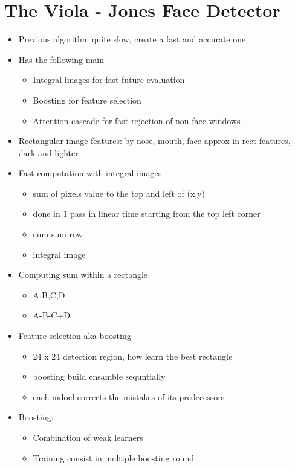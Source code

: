 \documentclass[12pt,oneside]{report}
\begin{document}
\section{The Viola - Jones Face Detector}
\begin{itemize}
    \item Previous algorithm quite slow, create a fast and accurate one
    \item Has the following main 
    \begin{itemize}
        \item Integral images for fast future evaluation
        \item Boosting for feature selection
        \item Attention cascade for fast rejection of non-face windows
    \end{itemize}
    \item Rectangular image features: by nose, mouth, face approx in rect features, dark and lighter
    \item Fast computation with integral images
    \begin{itemize}
        \item sum of pixels value to the top and left of (x,y)
        \item done in 1 pass in linear time starting from the top left corner
        \item cum sum row
        \item integral image
    \end{itemize}
    \item Computing sum within a rectangle
    \begin{itemize}
        \item A,B,C,D
        \item A-B-C+D
    \end{itemize}
    \item Feature selection aka boosting
    \begin{itemize}
        \item 24 x 24 detection region, how learn the best rectangle
        \item boosting build ensamble sequntially
        \item each mdoel corrects the mistakes of its predecessors
    \end{itemize}
    \item Boosting:
    \begin{itemize}
        \item Combination of weak learners
        \item Training consist in multiple boosting round

\end{itemize}
\end{itemize}
\end{document}

